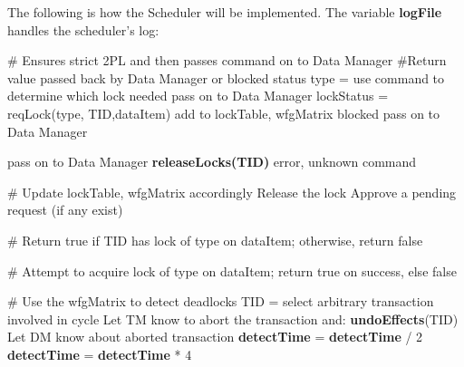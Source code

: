 The following is how the Scheduler will be implemented. The variable \textbf{logFile} handles the scheduler's log: \\

\begin{mdframed}
\begin{algorithmic}[H]
\State \# Ensures strict 2PL and then passes command on to Data Manager
\State \#Return value passed back by Data Manager or blocked status 
\State type = use command to determine which lock needed
		\State pass on to Data Manager
	\Else
		\State lockStatus = reqLock(type, TID,dataItem)
			\State add to lockTable, wfgMatrix
			\Return blocked
		\Else
			\State pass on to Data Manager
		\EndIf
	\EndIf	
	
	\State pass on to Data Manager
	\State \textbf{releaseLocks(TID)}
\Else
	\State error, unknown command
\EndIf

\EndFunction

\State	
\State \# Update lockTable, wfgMatrix accordingly
\State Release the lock
\State Approve a pending request (if any exist)
\EndFor
\EndFunction

\State
\State \# Return true if TID has lock of type on dataItem; otherwise, return false
 \EndFunction

\State
\State \# Attempt to acquire lock of type on dataItem; return true on success, else false
 \EndFunction

\State 
\State \# Use the wfgMatrix to detect deadlocks
	\State TID = select arbitrary transaction involved in cycle
	\State Let TM know to abort the transaction and: \textbf{undoEffects}(TID) 
	\State Let DM know about aborted transaction
	\State \textbf{detectTime} = \textbf{detectTime} / 2
	\State \Return
\EndIf
\State \textbf{detectTime} = \textbf{detectTime} * 4	
\EndFunction

\end{algorithmic} 
\end{mdframed}

